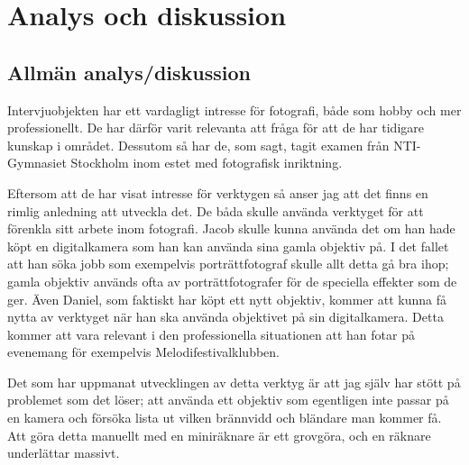 \documentclass[11pt]{article}
\begin{document}
\section{Analys och diskussion}
\subsection{Allmän analys/diskussion}
\sloppy
Intervjuobjekten har ett vardagligt intresse för fotografi, både som hobby och
mer professionellt. De har därför varit relevanta att fråga för att de har
tidigare kunskap i området. Dessutom så har de, som sagt, tagit examen från
NTI-Gymnasiet Stockholm inom estet med fotografisk inriktning. \par

Eftersom att de har visat intresse för verktygen så anser jag att det finns en
rimlig anledning att utveckla det. De båda skulle använda verktyget för att
förenkla sitt arbete inom fotografi. Jacob skulle kunna använda det om han hade
köpt en digitalkamera som han kan använda sina gamla objektiv på. I det fallet
att han söka jobb som exempelvis porträttfotograf skulle allt detta gå bra ihop;
gamla objektiv används ofta av porträttfotografer för de speciella effekter som
de ger. Även Daniel, som faktiskt har köpt ett nytt objektiv, kommer att kunna
få nytta av verktyget när han ska använda objektivet på sin digitalkamera. Detta
kommer att vara relevant i den professionella situationen att han fotar på
evenemang för exempelvis Melodifestivalklubben.\par

Det som har uppmanat utvecklingen av detta verktyg är att jag själv har stött på
problemet som det löser; att använda ett objektiv som egentligen inte passar på
en kamera och försöka lista ut vilken brännvidd och bländare man kommer få.
Att göra detta manuellt med en miniräknare är ett grovgöra, och en räknare
underlättar massivt.\par
\end{document}
